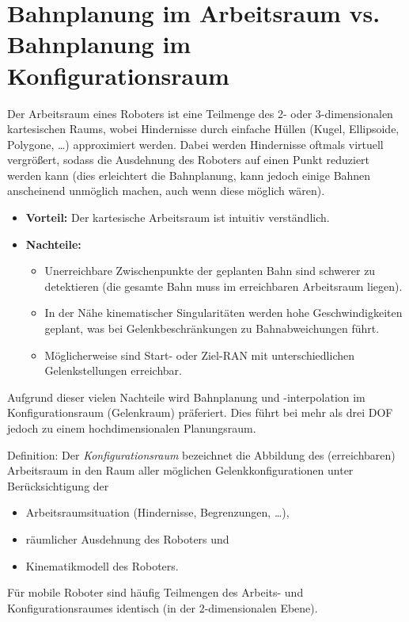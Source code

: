 	\section{Bahnplanung im Arbeitsraum vs. Bahnplanung im Konfigurationsraum}
		Der Arbeitsraum eines Roboters ist eine Teilmenge des 2- oder 3-dimensionalen kartesischen Raums, wobei Hindernisse durch einfache Hüllen (Kugel, Ellipsoide, Polygone, \dots) approximiert werden. Dabei werden Hindernisse oftmals virtuell vergrößert, sodass die Ausdehnung des Roboters auf einen Punkt reduziert werden kann (dies erleichtert die Bahnplanung, kann jedoch einige Bahnen anscheinend unmöglich machen, auch wenn diese möglich wären).
		\begin{itemize}
			\item \textbf{Vorteil:} Der kartesische Arbeitsraum ist intuitiv verständlich.
			\item \textbf{Nachteile:}
				\begin{itemize}
					\item Unerreichbare Zwischenpunkte der geplanten Bahn sind schwerer zu detektieren (die gesamte Bahn muss im erreichbaren Arbeitsraum liegen).
					\item In der Nähe kinematischer Singularitäten werden hohe Geschwindigkeiten geplant, was bei Gelenkbeschränkungen zu Bahnabweichungen führt.
					\item Möglicherweise sind Start- oder Ziel-RAN mit unterschiedlichen Gelenkstellungen erreichbar.
				\end{itemize}
		\end{itemize}
		Aufgrund dieser vielen Nachteile wird Bahnplanung und -interpolation im Konfigurationsraum (Gelenkraum) präferiert. Dies führt bei mehr als drei DOF jedoch zu einem hochdimensionalen Planungsraum.

		Definition: Der \emph{Konfigurationsraum} bezeichnet die Abbildung des (erreichbaren) Arbeitsraum in den Raum aller möglichen Gelenkkonfigurationen unter Berücksichtigung der
		\begin{itemize}
			\item Arbeitsraumsituation (Hindernisse, Begrenzungen, \dots),
			\item räumlicher Ausdehnung des Roboters und
			\item Kinematikmodell des Roboters.
		\end{itemize}
		Für mobile Roboter sind häufig Teilmengen des Arbeits- und Konfigurationsraumes identisch (\zB in der 2-dimensionalen Ebene).

